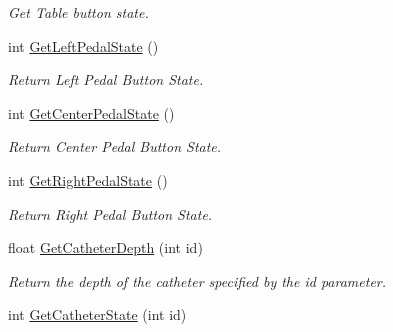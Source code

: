 \begin{DoxyCompactItemize}
\begin{DoxyCompactList}\small\item\em Get Table button state. \item\end{DoxyCompactList}\item 
\hypertarget{classvtkVSP_ae86717a441882e461ae6589ce9132488}{
int \hyperlink{classvtkVSP_ae86717a441882e461ae6589ce9132488}{GetLeftPedalState} ()}
\label{classvtkVSP_ae86717a441882e461ae6589ce9132488}

\begin{DoxyCompactList}\small\item\em Return Left Pedal Button State. \item\end{DoxyCompactList}\item 
\hypertarget{classvtkVSP_a2478197c4643ef8f8909e98160cecd41}{
int \hyperlink{classvtkVSP_a2478197c4643ef8f8909e98160cecd41}{GetCenterPedalState} ()}
\label{classvtkVSP_a2478197c4643ef8f8909e98160cecd41}

\begin{DoxyCompactList}\small\item\em Return Center Pedal Button State. \item\end{DoxyCompactList}\item 
\hypertarget{classvtkVSP_a52dbc63b8c38792574b84410e30ff380}{
int \hyperlink{classvtkVSP_a52dbc63b8c38792574b84410e30ff380}{GetRightPedalState} ()}
\label{classvtkVSP_a52dbc63b8c38792574b84410e30ff380}

\begin{DoxyCompactList}\small\item\em Return Right Pedal Button State. \item\end{DoxyCompactList}\item 
\hypertarget{classvtkVSP_a3c1800e84f6cd86412e69a195335c249}{
float \hyperlink{classvtkVSP_a3c1800e84f6cd86412e69a195335c249}{GetCatheterDepth} (int id)}
\label{classvtkVSP_a3c1800e84f6cd86412e69a195335c249}

\begin{DoxyCompactList}\small\item\em Return the depth of the catheter specified by the id parameter. \item\end{DoxyCompactList}\item 
\hypertarget{classvtkVSP_ab6b0f6233332fda07b6a9ac81c2f743c}{
int \hyperlink{classvtkVSP_ab6b0f6233332fda07b6a9ac81c2f743c}{GetCatheterState} (int id)}
\label{classvtkVSP_ab6b0f6233332fda07b6a9ac81c2f743c}


\end{DoxyCompactItemize}
